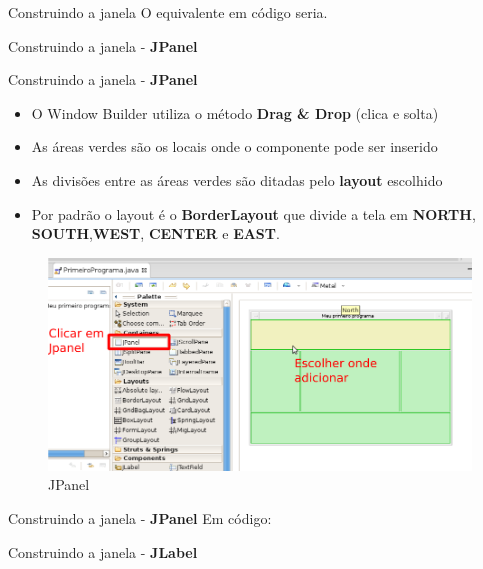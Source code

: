 \documentclass[10pt]{beamer}
\begin{document}
\begin{frame}{Construindo a janela}
O equivalente em código seria.

\end{frame}{}

\begin{frame}{Construindo a janela - \textbf{JPanel}}
\end{frame}{}

\begin{frame}{Construindo a janela - \textbf{JPanel}}
\begin{itemize}
\item O Window Builder utiliza o método \textbf{Drag \& Drop} (clica e solta)
\item As áreas verdes são os locais onde o componente pode ser inserido
\item As divisões entre as áreas verdes são ditadas pelo \textbf{layout} escolhido
\item Por padrão o layout é o \textbf{BorderLayout} que divide a tela em \textbf{NORTH}, \textbf{SOUTH},\textbf{WEST}, \textbf{CENTER} e \textbf{EAST}.
\end{itemize}
\begin{figure}[!htb]
    \centering
    \includegraphics[scale=.4]{jpanel}
    \caption{JPanel}
    \label{figRotulo}
  \end{figure}
\end{frame}{}

\begin{frame}{Construindo a janela - \textbf{JPanel}}
Em código:

\end{frame}{}

\begin{frame}{Construindo a janela - \textbf{JLabel}}
\end{frame}{}
\end{document}

